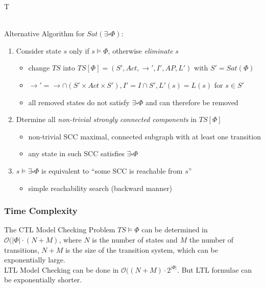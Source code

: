 \documentclass[a4paper, 10pt]{article}
\begin{document}
\begin{mdframed}
\begin{algorithm}[H]
{{        
    }
}
\Return T
\end{algorithm}
\ \\ Alternative Algorithm for $Sat(\exists\square\Phi)$: \\
\begin{enumerate}
    \item Consider state $s$ only if $s\models\Phi$, otherwise \emph{eliminate} $s$
    \begin{itemize}
        \item change $TS$ into $TS[\Phi]=(S',Act,\to',I',AP,L')$ with $S'=Sat(\Phi)$
        \item $\to'=\to\cap(S'\times Act\times S'), I'=I\cap S', L'(s)=L(s)$ for $s\in S'$
        \item[\follows] all removed states do not satisfy $\exists\square\Phi$ and can therefore be removed
    \end{itemize}
    \item Dtermine all \emph{non-trivial strongly connected components} in $TS[\Phi]$
    \begin{itemize}
        \item non-trivial SCC \follows maximal, connected subgraph with at least one transition
        \item[\follows] any state in such SCC satisfies $\exists\square\Phi$
    \end{itemize}
    \item $s\models\exists\square\Phi$ is equivalent to ``some SCC is reachable from $s$''
    \begin{itemize}
        \item simple reachability search (backward manner)
    \end{itemize}
\end{enumerate}
\end{mdframed}

\subsubsection{Time Complexity}

The CTL Model Checking Problem $TS\models\Phi$ can be determined in $\mathcal{O}(|\Phi|\cdot(N+M)$, where $N$ is the number of states and $M$ the number of transitions, $N+M$ is the size of the transition system, which can be exponentially large.
\\
LTL Model Checking can be done in $\mathcal{O}((N+M)\cdot 2^{|\Phi|}$. But LTL formulae can be exponentially shorter.
\end{document}
